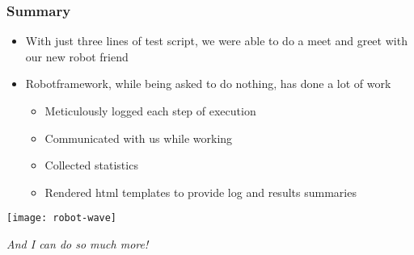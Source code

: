 \documentclass[xcolor=table,handout]{beamer}
\begin{document}
\begin{frame}\frametitle{Summary}
    \begin{itemize}
        \item With just three lines of test script, we were able to do a meet and greet with our new robot friend
        \item Robotframework, while being asked to do nothing, has done a lot of work
            \begin{itemize}
                \item Meticulously logged each step of execution
                \item Communicated with us while working
                \item Collected statistics
                \item Rendered html templates to provide log and results summaries
            \end{itemize}
    \end{itemize}
    \begin{center}
    \texttt{[image: robot-wave]}
        
    \emph{And I can do so much more!}
    \end{center}
\end{frame}
\end{document}
